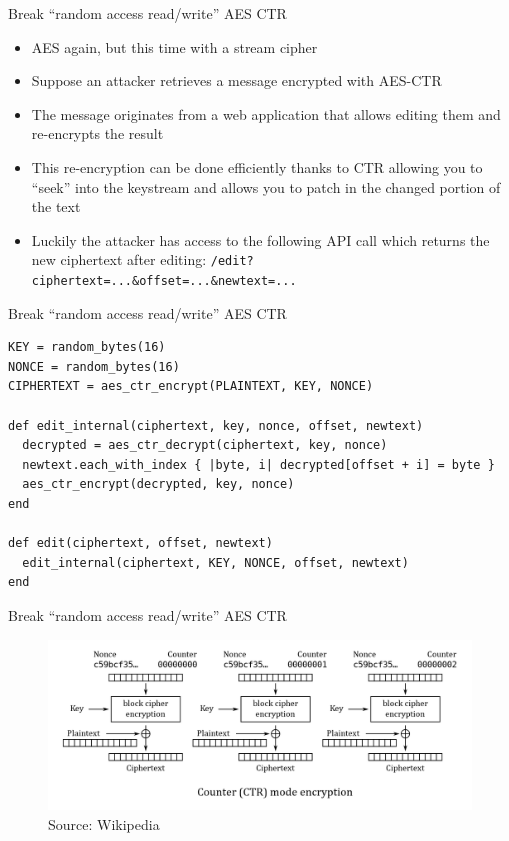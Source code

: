 \documentclass[presentation]{beamer}
\begin{document}
\begin{frame}[fragile,label={sec:orgf4ae2c1}]{Break “random access read/write” AES CTR}
 \begin{itemize}
\item AES again, but this time with a stream cipher
\item Suppose an attacker retrieves a message encrypted with AES-CTR
\item The message originates from a web application that allows editing
them and re-encrypts the result
\item This re-encryption can be done efficiently thanks to CTR allowing
you to “seek” into the keystream and allows you to patch in the
changed portion of the text
\item Luckily the attacker has access to the following API call which
returns the new ciphertext after editing:
\texttt{/edit?ciphertext=...\&offset=...\&newtext=...}
\end{itemize}
\end{frame}

\begin{frame}[fragile,label={sec:org75e32fd}]{Break “random access read/write” AES CTR}
 \begin{verbatim}
KEY = random_bytes(16)
NONCE = random_bytes(16)
CIPHERTEXT = aes_ctr_encrypt(PLAINTEXT, KEY, NONCE)

def edit_internal(ciphertext, key, nonce, offset, newtext)
  decrypted = aes_ctr_decrypt(ciphertext, key, nonce)
  newtext.each_with_index { |byte, i| decrypted[offset + i] = byte }
  aes_ctr_encrypt(decrypted, key, nonce)
end

def edit(ciphertext, offset, newtext)
  edit_internal(ciphertext, KEY, NONCE, offset, newtext)
end
\end{verbatim}
\end{frame}

\begin{frame}[label={sec:orgae0cd73}]{Break “random access read/write” AES CTR}
\begin{figure}[htbp]
\centering
\includegraphics[width=.9\linewidth]{./img/ctr_encryption.png}
\caption{Source: Wikipedia}
\end{figure}
\end{frame}
\end{document}
